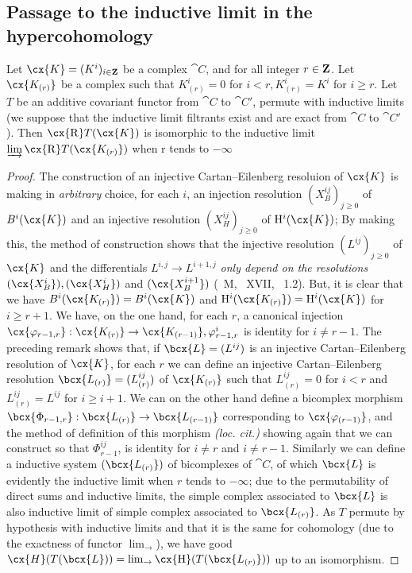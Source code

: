 \subsection{Passage to the inductive limit in the hypercohomology}
\label{subsection:0.11.5}
\begin{lemma}[11.5.1]
\label{0.11.5.1}
Let $\cx{K} = (K^i)_{i\in \bb{Z}}$ be a complex $\cat{C}$, and for all integer $r\in \mathbf{Z}$.
Let $\cx{K_{(r)}}$ be a complex such that $K_{(r)}^i = 0$ for $i<r, K_{(r)}^i = K^i$ for $i\geq r$.
Let $T$ be an additive covariant functor from $\cat{C}$ to $\cat{C'}$, permute with inductive limits 
(we suppose that the inductive limit filtrants exist and are exact from $\cat{C}$ to $\cat{C'}$).
Then $\cx{\RR}T(\cx{K})$ is isomorphic to the inductive limit $\varinjlim \cx{\RR} T(\cx{K_{(r)}})$ when r tends to $-\infty$
\end{lemma}
\begin{proof}
The construction of an injective Cartan--Eilenberg resoluion of $\cx{K}$ is making in \emph{arbitrary} choice, for each $i$, 
an injection resolution $(X_{B}^{ij})_{j\geq 0}$ of $B^i(\cx{K})$ and an injective resolution $(X_{H}^{ij})_{j\geq 0}$ of $\HH^i(\cx{K})$; 
By making this, the method of construction shows that the injective resolution $(L^{ij})_{j\geq 0}$ of $\cx{K}$ and 
the differentials $L^{i,j} \rightarrow L^{i+1, j}$ \emph{only depend on the resolutions} $(\cx{X_B^i}), (\cx{X_H^i})$ and $(\cx{X_B^{i+1}})$ (~M, ~XVII, ~1.2).
But, it is clear that we have $B^i(\cx{K_{(r)}}) = B^i(\cx{K})$ and $\HH^i(\cx{K_{(r)}}) = \HH^i(\cx{K})$ for $i\geq r+1$.
We have, on the one hand, for each $r$, a canonical injection $\cx{\varphi_{r-1, r}}: \cx{K_{(r)}} \rightarrow \cx{K_{(r-1)}}, \varphi_{r-1, r}^i$ is identity for $i\neq r-1$. 
The preceding remark shows that, if $\bcx{L} = (L^{ij})$ is an injective Cartan--Eilenberg resolution of $\cx{K}$,
for each $r$ we can define an injective Cartan--Eilenberg resolution $\bcx{L_{(r)}} = (L_{(r)}^{ij})$ of $\cx{K_{(r)}}$ such that $L_{(r)}^{ij} = 0$ for $i<r$ and $L_{(r)}^{ij} = L^{ij}$ for $i\geq i+1$.
We can on the other hand define a bicomplex morphism $\bcx{\Phi_{r-1, r}}: \bcx{L_{(r)}} \rightarrow \bcx{L_{(r-1)}}$ corresponding to $\cx{\varphi_{(r-1)}}$, and 
the method of definition of this morphism \emph{(loc. cit.)} showing again that we can construct so that $\Phi_{r-1}^{ij}$, is identity for $i\neq r$ and $i\neq r-1$.
Similarly we can define a inductive system $(\bcx{L_{(r)}})$ of bicomplexes of $\cat{C}$, 
of which $\bcx{L}$ is evidently the inductive limit when $r$ tends to $-\infty$; 
due to the permutability of direct sums and inductive limits, the simple complex associated to $\bcx{L}$ is also inductive limit of simple complex associated to $\bcx{L_{(r)}}$.
As $T$ permute by hypothesis with inductive limits and that it is the same for cohomology 
(due to the exactness of functor $\lim_{\to}$), we have good $\cx{H}(T(\bcx{L})) = \lim_{\to}\cx{\HH}(T(\bcx{L_{(r)}}))$ up to an isomorphism.
\end{proof}

